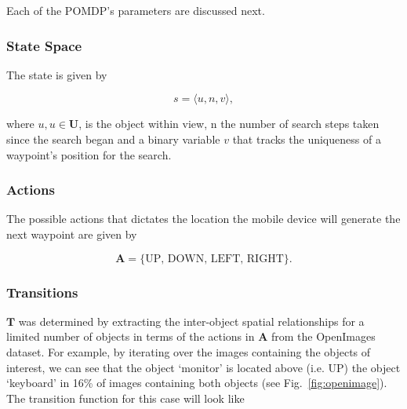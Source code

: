 \documentclass[runningheads]{llncs}
\begin{document}


Each of the POMDP's parameters are discussed next. 

\subsubsection{State Space}

The state is given by

\begin{equation}
  s = \langle u, n, v \rangle,
\end{equation}

\noindent where $u, u\in\mathbf{U}$, is the object within view, n the number of search steps taken since the search began and a binary variable $v$ that tracks the uniqueness of a waypoint's position for the search.

\subsubsection{Actions}

The possible actions that dictates the location the mobile device will generate the next waypoint are given by

\begin{equation}
  \mathbf{A} = \{ \textrm{UP, DOWN, LEFT, RIGHT} \}.
\end{equation}

\subsubsection{Transitions}

$\mathbf{T}$ was determined by extracting the inter-object spatial relationships for a limited number of objects in terms of the actions in $\mathbf{A}$ from the OpenImages~\cite{openimages} dataset. 
For example, by iterating over the images containing the objects of interest, we can see that the object `monitor' is located above (i.e. UP) the object `keyboard' in 16\% of images containing both objects (see Fig.~\ref{fig:openimage}). 
The transition function for this case will look like 
\end{document}
